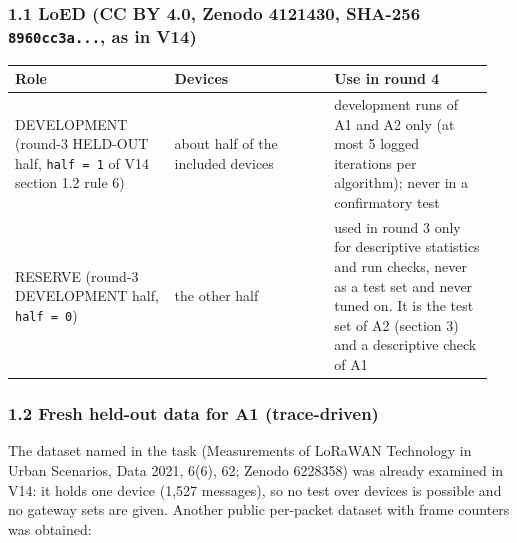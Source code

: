 \subsubsection*{1.1 LoED (CC BY 4.0, Zenodo 4121430, SHA-256 \texttt{8960cc3a...}, as in V14)}

{\scriptsize\raggedright
\begin{longtable}{p{0.317\linewidth}p{0.317\linewidth}p{0.317\linewidth}}
\toprule
Role & Devices & Use in round 4 \\
\midrule
\endhead
DEVELOPMENT (round-3 HELD-OUT half, \texttt{half = 1} of V14 section 1.2 rule 6) & about half of the included devices & development runs of A1 and A2 only (at most 5 logged iterations per algorithm); never in a confirmatory test \\
RESERVE (round-3 DEVELOPMENT half, \texttt{half = 0}) & the other half & used in round 3 only for descriptive statistics and run checks, never as a test set and never tuned on. It is the test set of A2 (section 3) and a descriptive check of A1 \\
\bottomrule
\end{longtable}}

\subsubsection*{1.2 Fresh held-out data for A1 (trace-driven)}

The dataset named in the task (Measurements of LoRaWAN Technology in Urban Scenarios, Data 2021, 6(6), 62; Zenodo 6228358) was already examined in V14: it holds one device (1,527 messages), so no test over devices is possible and no gateway sets are given. Another public per-packet dataset with frame counters was obtained:

